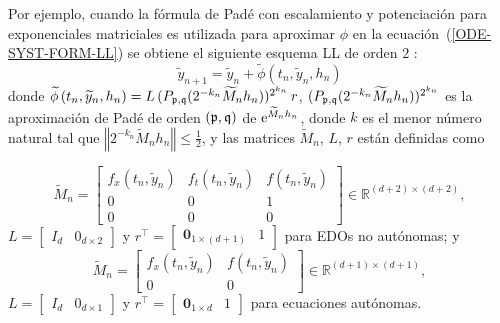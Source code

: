 Por ejemplo, cuando la fórmula de Padé con escalamiento y potenciación para exponenciales matriciales \cite{moler2003nineteen} es utilizada para
aproximar $\phi$ en la ecuación~(\ref{ODE-SYST-FORM-LL}) se obtiene el siguiente esquema LL de orden $2$ \cite{Jimenez02AMC}:
\begin{equation} 
\widetilde{y}_{n+1}=\widetilde{y}_{n}+\widetilde{\phi}\left( t_{n},\widetilde{y}_{n},h_{n}\right) \label{LL-scheme}
\end{equation} 
donde $\widetilde{\phi }\left( t_{n},\widetilde{y}
_{n},h_{n}\right) =L\,(P_{\mathfrak{p},\mathfrak{q}}(2^{-k_{n}}\widetilde{M}_{n}h_{n}))^{2^{k_{n}}}\,r$, 
$(P_{\mathfrak{p},\mathfrak{q}}(2^{-k_{n}}\widetilde{M}_{n}h_{n}))^{2^{k_{n}}}$ es la aproximación
de Padé de orden $(\mathfrak{p},\mathfrak{q})$ de  $\mathrm{e}^{\widetilde{M}_{n}h_{n}}$, donde
$k$ es el menor número natural tal que $\left\Vert 2^{-k_{n}}\widetilde{M}_{n}h_{n}\right\Vert \leq \frac{1}{2}$, 
y las matrices $\widetilde{M}_{n}$, $L$, $r$ están definidas como

\begin{equation*}
\widetilde{M}_{n}=\left[ 
\begin{array}{ccc}
f_{x}(t_{n},\widetilde{y}_{n}) &f%
_{t}(t_{n},\widetilde{y}_{n}) & f(t_{n},\widetilde{
		y}_{n}) \\ 
0 & 0 & 1 \\ 
0 & 0 & 0%
\end{array}%
\right] \in \mathbb{R}^{(d+2)\times (d+2)},
\end{equation*}%
$L=\left[ 
\begin{array}{ll}
I_{d} & 0_{d\times 2}%
\end{array}%
\right] $ y $r^{\intercal }=\left[ 
\begin{array}{ll}
\mathbf{0}_{1\times (d+1)} & 1%
\end{array}%
\right] $ para EDOs no autónomas; y 
\begin{equation*}
\widetilde{M}_{n}=\left[ 
\begin{array}{cc}
f_{x}(t_{n},\widetilde{y}_{n}) & f(t_{n},%
\widetilde{y}_{n}) \\ 
0 & 0%
\end{array}%
\right] \in \mathbb{R}^{(d+1)\times (d+1)},
\end{equation*}%
$L=\left[ 
\begin{array}{ll}
I_{d} & 0_{d\times 1}%
\end{array}%
\right] $ y $r^{\intercal }=\left[ 
\begin{array}{ll}
\mathbf{0}_{1\times d} & 1%
\end{array}%
\right] $ para ecuaciones autónomas.

